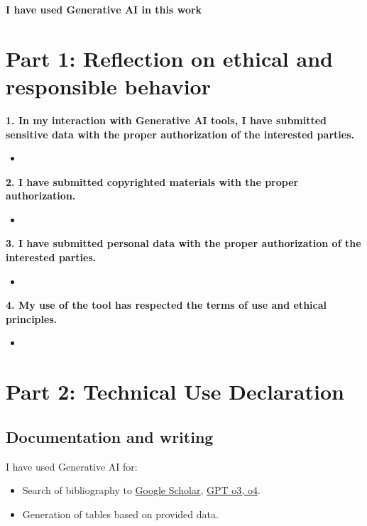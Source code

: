 
\textbf{I have used Generative AI in this work} \quad {}

\section*{Part 1: Reflection on ethical and responsible behavior}

\textbf{1. In my interaction with Generative AI tools, I have submitted sensitive data with the proper authorization of the interested parties.}
\begin{itemize}
  \item[] 
\end{itemize}

\textbf{2. I have submitted copyrighted materials with the proper authorization.}
\begin{itemize}
  \item[] 
\end{itemize}

\textbf{3. I have submitted personal data with the proper authorization of the interested parties.}
\begin{itemize}
  \item[] 
\end{itemize}

\textbf{4. My use of the tool has respected the terms of use and ethical principles.}
\begin{itemize}
  \item[] 
\end{itemize}


\section*{Part 2: Technical Use Declaration}


\subsection*{Documentation and writing}
I have used Generative AI for:
\begin{itemize}
  \item Search of bibliography to \href{https://www.google.com}{Google Scholar}, \href{https://openai.com}{GPT o3, o4}.
  \item Generation of tables based on provided data.
\end{itemize}

